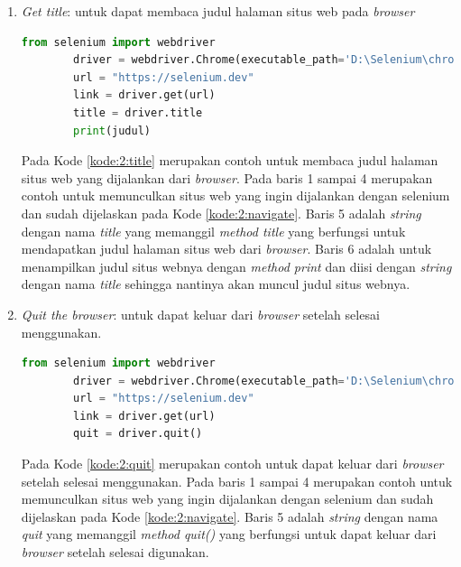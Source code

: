 \begin{enumerate}
	\item \textit{Get title}: untuk dapat membaca judul halaman situs web pada \textit{browser}
	\begin{lstlisting}[language=python, caption=Contoh kode Get title, label=kode:2:title]
		from selenium import webdriver
		driver = webdriver.Chrome(executable_path='D:\Selenium\chromedriver.exe')
		url = "https://selenium.dev"
		link = driver.get(url)
		title = driver.title
		print(judul)
	\end{lstlisting}
	Pada Kode \ref{kode:2:title} merupakan contoh untuk membaca judul halaman situs web yang dijalankan dari \textit{browser}. Pada baris 1 sampai 4 merupakan contoh untuk memunculkan situs web yang ingin dijalankan dengan selenium dan sudah dijelaskan pada Kode \ref{kode:2:navigate}. Baris 5 adalah \textit{string} dengan nama \textit{title} yang memanggil \textit{method title} yang berfungsi untuk mendapatkan judul halaman situs web dari \textit{browser}. Baris 6 adalah untuk menampilkan judul situs webnya dengan \textit{method print} dan diisi dengan \textit{string} dengan nama \textit{title} sehingga nantinya akan muncul judul situs webnya.\\ 
	\item \textit{Quit the browser}: untuk dapat keluar dari \textit{browser} setelah selesai menggunakan.
	\begin{lstlisting}[language=python, caption=Contoh kode Get title, label=kode:2:quit]
		from selenium import webdriver
		driver = webdriver.Chrome(executable_path='D:\Selenium\chromedriver.exe')
		url = "https://selenium.dev"
		link = driver.get(url)
		quit = driver.quit()
	\end{lstlisting}
	Pada Kode \ref{kode:2:quit} merupakan contoh untuk dapat keluar dari \textit{browser} setelah selesai menggunakan. Pada baris 1 sampai 4 merupakan contoh untuk memunculkan situs web yang ingin dijalankan dengan selenium dan sudah dijelaskan pada Kode \ref{kode:2:navigate}. Baris 5 adalah \textit{string} dengan nama \textit{quit} yang memanggil \textit{method quit()} yang berfungsi untuk dapat keluar dari \textit{browser} setelah selesai digunakan.
\end{enumerate}

